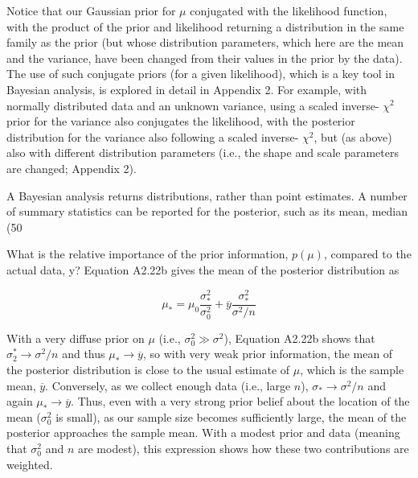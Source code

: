 \documentclass{article}
\begin{document}
Notice that our Gaussian prior for  $ \mu $ conjugated with the likelihood function, with the product of the prior and likelihood returning a distribution in the same family as the prior (but whose distribution parameters, which here are the mean and the variance, have been changed from their values in the prior by the data). The use of such conjugate priors (for a given likelihood), which is a key tool in Bayesian analysis, is explored in detail in Appendix 2. For example, with normally distributed data and an unknown variance, using a scaled inverse- $ \chi^2 $ prior for the variance also conjugates the likelihood, with the posterior distribution for the variance also following a scaled inverse- $ \chi^2 $, but (as above) also with different distribution parameters (i.e., the shape and scale parameters are changed; Appendix 2).

A Bayesian analysis returns distributions, rather than point estimates. A number of summary statistics can be reported for the posterior, such as its mean, median (50%

What is the relative importance of the prior information,  $ p(\mu) $, compared to the actual data, y? Equation A2.22b gives the mean of the posterior distribution as

\begin{equation}
\mu_{*}=\mu_{0}\frac{\sigma_{*}^{2}}{\sigma_{0}^{2}}+\overline{y}\frac{\sigma_{*}^{2}}{\sigma^{2}/n}
\end{equation}

With a very diffuse prior on $\mu$ (i.e., $\sigma_0^2 \gg \sigma^2$), Equation A2.22b shows that $\sigma_2^* \to \sigma^2/n$ and thus $\mu_* \to \overline{y}$, so with very weak prior information, the mean of the posterior distribution is close to the usual estimate of $\mu$, which is the sample mean, $\overline{y}$. Conversely, as we collect enough data (i.e., large $n$), $\sigma_*\to \sigma^2/n$ and again $\mu_*\to \overline{y}$. Thus, even with a very strong prior belief about the location of the mean ($\sigma_0^2$ is small), as our sample size becomes sufficiently large, the mean of the posterior approaches the sample mean. With a modest prior and data (meaning that $\sigma_0^2$ and $n$ are modest), this expression shows how these two contributions are weighted.
\end{document}
